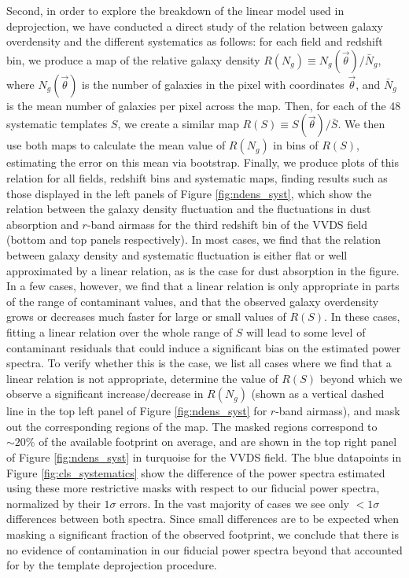 \documentclass[a4paper,11pt]{article}
\newcommand{\nv}{\vec{\theta}}
\begin{document}
      Second, in order to explore the breakdown of the linear model used in deprojection, we have conducted a direct study of the relation between galaxy overdensity and the different systematics as follows: for each field and redshift bin, we produce a map of the relative galaxy density $R(N_g)\equiv N_g(\nv)/\bar{N}_g$, where $N_g(\nv)$ is the number of galaxies in the pixel with coordinates $\nv$, and $\bar{N}_g$ is the mean number of galaxies per pixel across the map. Then, for each of the 48 systematic templates $S$, we create a similar map $R(S)\equiv S(\nv)/\bar{S}$. We then use both maps to calculate the mean value of $R(N_g)$ in bins of $R(S)$, estimating the error on this mean via bootstrap. Finally, we produce plots of this relation for all fields, redshift bins and systematic maps, finding results such as those displayed in the left panels of Figure \ref{fig:ndens_syst}, which show the relation between the galaxy density fluctuation and the fluctuations in dust absorption and $r$-band airmass for the third redshift bin of the VVDS field (bottom and top panels respectively). In most cases, we find that the relation between galaxy density and systematic fluctuation is either flat or well approximated by a linear relation, as is the case for dust absorption in the figure. In a few cases, however, we find that a linear relation is only appropriate in parts of the range of contaminant values, and that the observed galaxy overdensity grows or decreases much faster for large or small values of $R(S)$. In these cases, fitting a linear relation over the whole range of $S$ will lead to some level of contaminant residuals that could induce a significant bias on the estimated power spectra. To verify whether this is the case, we list all cases where we find that a linear relation is not appropriate, determine the value of $R(S)$ beyond which we observe a significant increase/decrease in $R(N_g)$ (shown as a vertical dashed line in the top left panel of Figure \ref{fig:ndens_syst} for $r$-band airmass), and mask out the corresponding regions of the map. The masked regions correspond to $\sim20\%$ of the available footprint on average, and are shown in the top right panel of Figure \ref{fig:ndens_syst} in turquoise for the VVDS field. The blue datapoints in Figure \ref{fig:cls_systematics} show the difference of the power spectra estimated using these more restrictive masks with respect to our fiducial power spectra, normalized by their $1\sigma$ errors. In the vast majority of cases we see only $<1\sigma$ differences between both spectra. Since small differences are to be expected when masking a significant fraction of the observed footprint, we conclude that there is no evidence of contamination in our fiducial power spectra beyond that accounted for by the template deprojection procedure.
\end{document}
